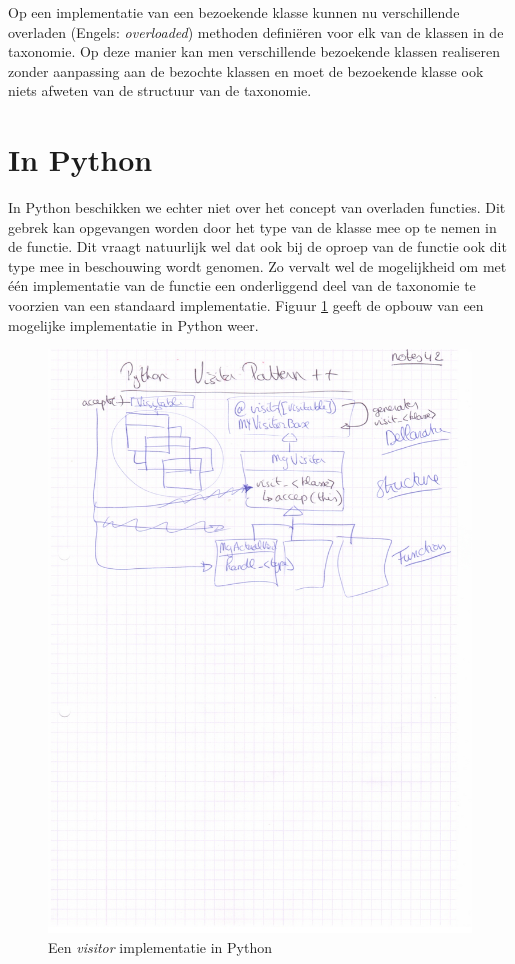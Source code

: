 Op een implementatie van een bezoekende klasse kunnen nu verschillende
overladen (Engels: \emph{overloaded}) methoden defini\"eren voor elk van de
klassen in de taxonomie. Op deze manier kan men verschillende bezoekende
klassen realiseren zonder aanpassing aan de bezochte klassen en moet de
bezoekende klasse ook niets afweten van de structuur van de taxonomie.

\section{In Python}

In Python beschikken we echter niet over het concept van overladen functies.
Dit gebrek kan opgevangen worden door het type van de klasse mee op te nemen in
de  functie. Dit vraagt natuurlijk wel dat ook bij de oproep van de
 functie ook dit type mee in beschouwing wordt genomen. Zo
vervalt wel de mogelijkheid om met \'e\'en implementatie van de functie een
onderliggend deel van de taxonomie te voorzien van een standaard implementatie.
Figuur \ref{fig:py-visitor} geeft de opbouw van een mogelijke implementatie in
Python weer.

\begin{figure}[ht]
  \centering
  \includegraphics[width=0.77\linewidth]{resources/py-visitor.pdf}
  \caption{Een \emph{visitor} implementatie in Python}
  \label{fig:py-visitor}
\end{figure}

